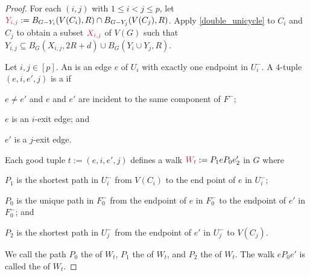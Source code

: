 \documentclass{patmorin}
\newcommand{\pat}[1]{\textcolor{Blue}{Pat: #1}}
\DeclarePairedDelimiter\set{\{}{\}}
\begin{document}
\begin{proof}
For each $(i,j)$ with $1\le i < j \le p$, let $\mathdefin{Y_{i,j}}:=B_{G-Y_i}(V(C_i),R)\cap B_{G-Y_j}(V(C_j),R)$.  Apply \cref{double_unicycle} to $C_i$ and $C_j$ to obtain a subset $\mathdefin{X_{i,j}}$ of $V(G)$ such that $Y_{i,j}\subseteq B_G(X_{i,j},2R+d) \cup B_G(Y_i\cup Y_j,R)$.


Let $i,j\in[p]$. An  is an edge $e$ of $U_i$ with exactly one endpoint in $U^-_i$.
A $4$-tuple $(e,i,e',j)$ is a  if
\begin{compactitem}
  \item $e\neq e'$ and $e$ and $e'$ are incident to the same component of $F^-$;
  \item $e$ is an $i$-exit edge;
  and \item $e'$ is a $j$-exit edge.
\end{compactitem}
Each good tuple $t:=(e,i,e',j)$  defines a walk $\mathdefin{W_t}:=P_1eP_0e'_2$ in $G$ where
\begin{compactitem}
  \item $P_1$ is the shortest path in $U_i^-$ from $V(C_i)$ to the end point of $e$ in $U^-_i$;
  \item $P_0$ is the unique path in $F_0^-$ from the endpoint of $e$ in $F^-_0$ to the endpoint of $e'$ in $F^-_0$; and
  \item $P_2$ is the shortest path in $U_j^-$ from the endpoint of $e'$ in $U_j^-$ to $V(C_j)$.
\end{compactitem}
We call the path $P_0$ the  of $W_t$, $P_1$ the  of $W_t$, and $P_2$ the  of $W_t$.  The walk $eP_0e'$ is called the  of $W_t$.





\end{proof}
\end{document}
